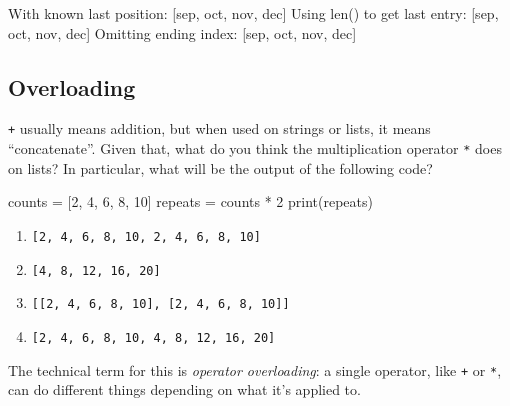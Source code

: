 \documentclass[
  letterpaper,
  DIV=11,
  numbers=noendperiod]{scrartcl}
\newenvironment{Shaded}{\begin{snugshade}}{\end{snugshade}}
\newcommand{\BuiltInTok}[1]{\textcolor[rgb]{0.00,0.23,0.31}{#1}}
\newcommand{\DecValTok}[1]{\textcolor[rgb]{0.68,0.00,0.00}{#1}}
\newcommand{\NormalTok}[1]{\textcolor[rgb]{0.00,0.23,0.31}{#1}}
\newcommand{\OperatorTok}[1]{\textcolor[rgb]{0.37,0.37,0.37}{#1}}
\providecommand{\tightlist}{%
  \setlength{\itemsep}{0pt}\setlength{\parskip}{0pt}}
\theoremstyle{remark}
\begin{document}
\begin{Shaded}
\begin{Highlighting}[]
\NormalTok{With known last position: [\textquotesingle{}sep\textquotesingle{}, \textquotesingle{}oct\textquotesingle{}, \textquotesingle{}nov\textquotesingle{}, \textquotesingle{}dec\textquotesingle{}]}
\NormalTok{Using len() to get last entry: [\textquotesingle{}sep\textquotesingle{}, \textquotesingle{}oct\textquotesingle{}, \textquotesingle{}nov\textquotesingle{}, \textquotesingle{}dec\textquotesingle{}]}
\NormalTok{Omitting ending index: [\textquotesingle{}sep\textquotesingle{}, \textquotesingle{}oct\textquotesingle{}, \textquotesingle{}nov\textquotesingle{}, \textquotesingle{}dec\textquotesingle{}]}
\end{Highlighting}
\end{Shaded}

\subsection{Overloading}\label{overloading}

\texttt{+} usually means addition, but when used on strings or lists, it
means ``concatenate''. Given that, what do you think the multiplication
operator \texttt{*} does on lists? In particular, what will be the
output of the following code?

\begin{Shaded}
\begin{Highlighting}[]
\NormalTok{counts }\OperatorTok{=}\NormalTok{ [}\DecValTok{2}\NormalTok{, }\DecValTok{4}\NormalTok{, }\DecValTok{6}\NormalTok{, }\DecValTok{8}\NormalTok{, }\DecValTok{10}\NormalTok{]}
\NormalTok{repeats }\OperatorTok{=}\NormalTok{ counts }\OperatorTok{*} \DecValTok{2}
\BuiltInTok{print}\NormalTok{(repeats)}
\end{Highlighting}
\end{Shaded}

\begin{enumerate}
\def\labelenumi{\arabic{enumi}.}
\tightlist
\item
  \texttt{{[}2,\ 4,\ 6,\ 8,\ 10,\ 2,\ 4,\ 6,\ 8,\ 10{]}}
\item
  \texttt{{[}4,\ 8,\ 12,\ 16,\ 20{]}}
\item
  \texttt{{[}{[}2,\ 4,\ 6,\ 8,\ 10{]},\ {[}2,\ 4,\ 6,\ 8,\ 10{]}{]}}
\item
  \texttt{{[}2,\ 4,\ 6,\ 8,\ 10,\ 4,\ 8,\ 12,\ 16,\ 20{]}}
\end{enumerate}

The technical term for this is \emph{operator overloading}: a single
operator, like \texttt{+} or \texttt{*}, can do different things
depending on what it's applied to.
\end{document}
